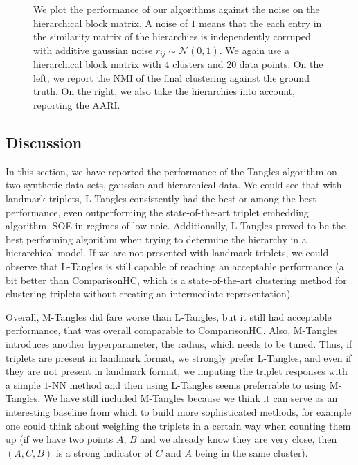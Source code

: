 \onecolumn
\begin{figure}[ht]
    \centering
    \caption{
        We plot the performance of our algorithms against the noise on the hierarchical block matrix. A noise of $1$ means that the each 
        entry in the similarity matrix of the hierarchies is independently corruped with additive gaussian noise $r_{ij} \sim \mathcal{N}(0, 1)$.
        We again use a hierarchical block matrix with $4$ clusters and $20$ data points. On the left, we report the NMI of the final clustering against the ground
        truth. On the right, we also take the hierarchies into account, reporting the AARI.
    }
    \label{fig:hierarchy-add-hierarchy-noise}
\end{figure}

\subsection{Discussion}
In this section, we have reported the performance of the Tangles algorithm on two synthetic data sets, gaussian and hierarchical data. 
We could see that with landmark triplets, L-Tangles consistently had the best or among the best performance, even outperforming the 
state-of-the-art triplet embedding algorithm, SOE in regimes of low noie. Additionally, L-Tangles proved to be the best performing algorithm when 
trying to determine the hierarchy in a hierarchical model.  If we are not presented with landmark triplets, we could observe that L-Tangles is still capable of reaching 
an acceptable performance (a bit better than ComparisonHC, which is a state-of-the-art clustering method for clustering triplets without creating an intermediate representation).

Overall, M-Tangles did fare worse than L-Tangles, but it still had acceptable performance, that was overall comparable to ComparisonHC. Also, M-Tangles introduces another hyperparameter, 
the radius, which needs to be tuned. Thus, if triplets are present in landmark format, we strongly prefer L-Tangles, and even if they are not present in landmark format, we imputing the triplet responses
with a simple $1$-NN method and then using L-Tangles seems preferrable to using M-Tangles. We have still included M-Tangles because we think it can serve as an interesting 
baseline from which to build more sophisticated methods, for example one could think about weighing the triplets in a certain way when counting them up (if we have two points $A$, $B$ and we already know
they are very close, then $(A, C, B)$ is a strong indicator of $C$ and $A$ being in the same cluster). 

